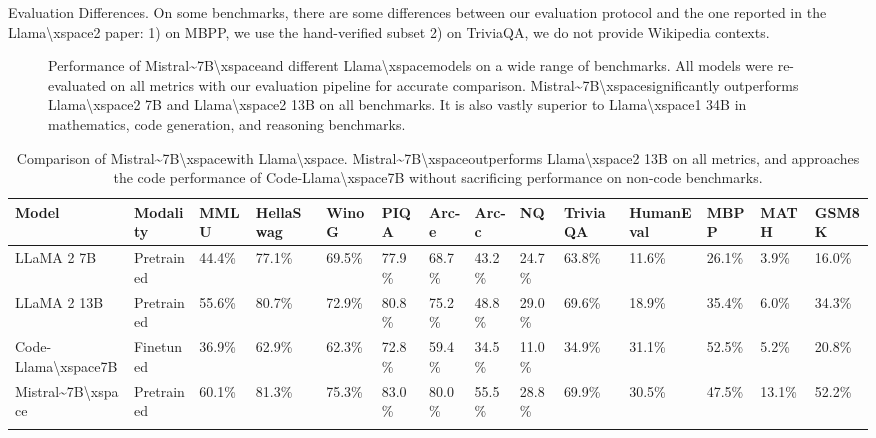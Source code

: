 \documentclass[11pt,a4paper]{article}
\begin{document}
Evaluation Differences. On some benchmarks, there are some differences between our evaluation protocol and the one reported in the Llama\textbackslash{}xspace2 paper: 1) on MBPP, we use the hand-verified subset 2) on TriviaQA, we do not provide Wikipedia contexts.

\begin{figure}[h]
\caption{Performance of Mistral\textasciitilde{}7B\textbackslash{}xspaceand different Llama\textbackslash{}xspacemodels on a wide range of benchmarks. All models were re-evaluated on all metrics with our evaluation pipeline for accurate comparison. Mistral\textasciitilde{}7B\textbackslash{}xspacesignificantly outperforms Llama\textbackslash{}xspace2 7B and Llama\textbackslash{}xspace2 13B on all benchmarks. It is also vastly superior to Llama\textbackslash{}xspace1 34B in mathematics, code generation, and reasoning benchmarks.}
\end{figure}

\begin{table}[h]
\caption{Comparison of Mistral\textasciitilde{}7B\textbackslash{}xspacewith Llama\textbackslash{}xspace. Mistral\textasciitilde{}7B\textbackslash{}xspaceoutperforms Llama\textbackslash{}xspace2 13B on all metrics, and approaches the code performance of Code-Llama\textbackslash{}xspace7B without sacrificing performance on non-code benchmarks.}
\begin{tabular}{|l|l|l|l|l|l|l|l|l|l|l|l|l|l|}
\hline
Model & Modality & MMLU & HellaSwag & WinoG & PIQA & Arc-e & Arc-c & NQ & TriviaQA & HumanEval & MBPP & MATH & GSM8K \\ \hline
LLaMA 2 7B & Pretrained & 44.4\% & 77.1\% & 69.5\% & 77.9\% & 68.7\% & 43.2\% & 24.7\% & 63.8\% & 11.6\% & 26.1\% & 3.9\% & 16.0\% \\ \hline
LLaMA 2 13B & Pretrained & 55.6\% & 80.7\% & 72.9\% & 80.8\% & 75.2\% & 48.8\% & 29.0\% & 69.6\% & 18.9\% & 35.4\% & 6.0\% & 34.3\% \\ \hline
Code-Llama\textbackslash{}xspace7B & Finetuned & 36.9\% & 62.9\% & 62.3\% & 72.8\% & 59.4\% & 34.5\% & 11.0\% & 34.9\% & 31.1\% & 52.5\% & 5.2\% & 20.8\% \\ \hline
Mistral\textasciitilde{}7B\textbackslash{}xspace & Pretrained & 60.1\% & 81.3\% & 75.3\% & 83.0\% & 80.0\% & 55.5\% & 28.8\% & 69.9\% & 30.5\% & 47.5\% & 13.1\% & 52.2\% \\ \hline
 &  &  &  &  &  &  &  &  &  &  &  &  &  \\ \hline
\end{tabular}
\end{table}
\end{document}
